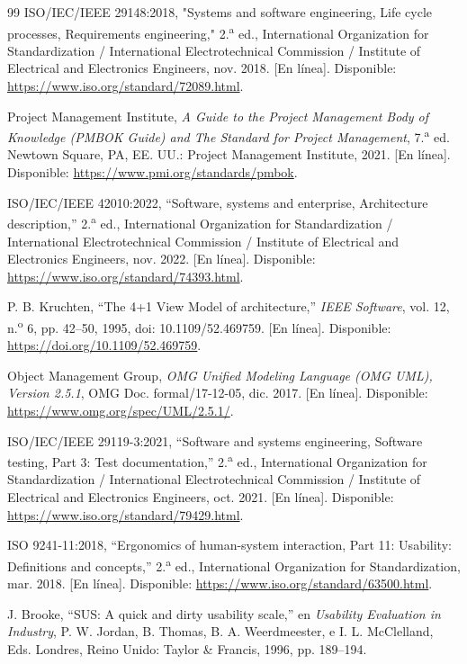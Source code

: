 \documentclass[12pt,letterpaper,oneside]{article}
\begin{document}
\begin{thebibliography}{99}
 ISO/IEC/IEEE 29148:2018, "Systems and software engineering, Life cycle processes, Requirements engineering," 2.\textsuperscript{a} ed., International Organization for Standardization / International Electrotechnical Commission / Institute of Electrical and Electronics Engineers, nov. 2018. [En línea]. Disponible: \url{https://www.iso.org/standard/72089.html}.

 Project Management Institute, \textit{A Guide to the Project Management Body of Knowledge (PMBOK Guide) and The Standard for Project Management}, 7.\textsuperscript{a} ed. Newtown Square, PA, EE. UU.: Project Management Institute, 2021. [En línea]. Disponible: \url{https://www.pmi.org/standards/pmbok}.

 ISO/IEC/IEEE 42010:2022, ``Software, systems and enterprise, Architecture description,'' 2.\textsuperscript{a} ed., International Organization for Standardization / International Electrotechnical Commission / Institute of Electrical and Electronics Engineers, nov. 2022. [En línea]. Disponible: \url{https://www.iso.org/standard/74393.html}.

 P. B. Kruchten, ``The 4+1 View Model of architecture,'' \textit{IEEE Software}, vol. 12, n.\textsuperscript{o} 6, pp. 42--50, 1995, doi: 10.1109/52.469759. [En línea]. Disponible: \url{https://doi.org/10.1109/52.469759}.

 Object Management Group, \textit{OMG Unified Modeling Language (OMG UML), Version 2.5.1}, OMG Doc. formal/17-12-05, dic. 2017. [En línea]. Disponible: \url{https://www.omg.org/spec/UML/2.5.1/}.

 ISO/IEC/IEEE 29119-3:2021, ``Software and systems engineering, Software testing, Part 3: Test documentation,'' 2.\textsuperscript{a} ed., International Organization for Standardization / International Electrotechnical Commission / Institute of Electrical and Electronics Engineers, oct. 2021. [En línea]. Disponible: \url{https://www.iso.org/standard/79429.html}.

 ISO 9241-11:2018, ``Ergonomics of human-system interaction, Part 11: Usability: Definitions and concepts,'' 2.\textsuperscript{a} ed., International Organization for Standardization, mar. 2018. [En línea]. Disponible: \url{https://www.iso.org/standard/63500.html}.

 J. Brooke, ``SUS: A quick and dirty usability scale,'' en \textit{Usability Evaluation in Industry}, P. W. Jordan, B. Thomas, B. A. Weerdmeester, e I. L. McClelland, Eds. Londres, Reino Unido: Taylor \& Francis, 1996, pp. 189--194.


\end{thebibliography}
\end{document}
